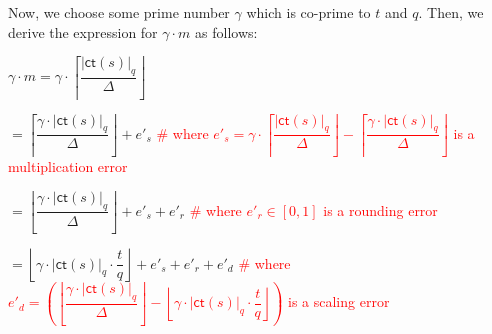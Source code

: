 








Now, we choose some prime number $\gamma$ which is co-prime to $t$ and $q$. Then, we derive the expression for $\gamma \cdot m$ as follows:

$\gamma \cdot m =  \gamma\cdot \left\lceil\dfrac{ |\textsf{ct}(s)|_q}{\Delta}\right\rfloor$

$ = \left\lceil\dfrac{\gamma\cdot |\textsf{ct}(s)|_q}{\Delta}\right\rfloor + e'_s $ \textcolor{red}{ \# where $e'_s = \gamma\cdot \left\lceil\dfrac{ |\textsf{ct}(s)|_q}{\Delta}\right\rfloor - \left\lceil\dfrac{\gamma\cdot |\textsf{ct}(s)|_q}{\Delta}\right\rfloor$ is a multiplication error}

$ =  \left\lfloor\dfrac{\gamma \cdot |\textsf{ct}(s)|_q}{\Delta}\right\rfloor + e'_s + e'_r$ \textcolor{red}{ \# where $e'_r \in [0, 1]$ is a rounding error}

$ =  \left\lfloor\gamma \cdot | \textsf{ct}(s)|_q\cdot \dfrac{t}{q} \right\rfloor + e'_s + e'_r + e'_d$  \textcolor{red}{ \# where $e'_d =  \left(\left\lfloor\dfrac{\gamma \cdot |\textsf{ct}(s)|_q}{\Delta}\right\rfloor - \left\lfloor \gamma \cdot |\textsf{ct}(s)|_q\cdot \dfrac{t}{q} \right\rfloor\right)$ is a scaling error} 

